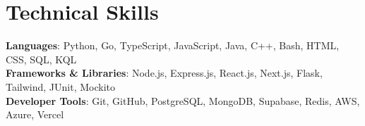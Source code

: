 \section{Technical Skills}
\begin{itemize}[leftmargin=0.15in, label={}]
    \small{\item{     
        \textbf{Languages}{: Python, Go, TypeScript, JavaScript, Java, C++, Bash, HTML, CSS, SQL, KQL} \\
     
        \textbf{Frameworks \& Libraries}{: Node.js, Express.js, React.js, Next.js, Flask, Tailwind, JUnit, Mockito} \\

        \textbf{Developer Tools}{: Git, GitHub, PostgreSQL, MongoDB, Supabase, Redis, AWS, Azure, Vercel} \\
    }}
\end{itemize}
